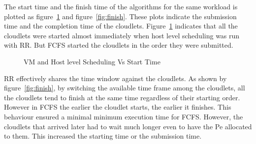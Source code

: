 \documentclass[times, 10pt,twocolumn]{article}
\begin{document}
The start time and the finish time of the algorithms for the same workload is plotted as figure~\ref{fig:start} and figure~\ref{fig:finish}. These plots indicate the submission time and the completion time of the cloudlets. Figure~\ref{fig:start} indicates that all the cloudlets were started almost immediately when host level scheduling was run with RR. But FCFS started the cloudlets in the order they were submitted. 
\begin{figure}[ht]
 \caption{VM and Host level Scheduling Vs Start Time}
 \label{fig:start}
\end{figure}

RR effectively shares the time window against the cloudlets. As shown by figure~\ref{fig:finish}, by switching the available time frame among the cloudlets, all the cloudlets tend to finish at the same time regardless of their starting order. However in FCFS the earlier the cloudlet starts, the earlier it finishes. This behaviour ensured a minimal minimum execution time for FCFS. However, the cloudlets that arrived later had to wait much longer even to have the Pe allocated to them. This increased the starting time or the submission time. 
\end{document}

